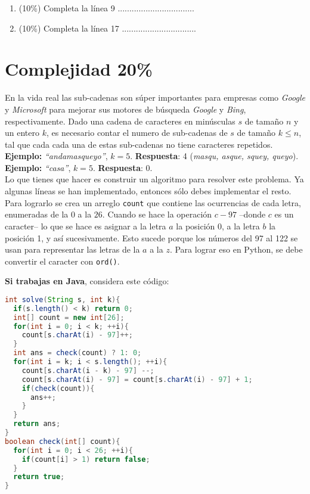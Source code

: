 \documentclass[10 pt]{article}
\begin{document}
\begin{enumerate}[label=\alph*]
\item (10\%) Completa la línea 9 .................................
\item (10\%) Completa la línea 17 ................................
\end{enumerate}

\newpage

\section{Complejidad 20\%}
En la vida real las sub-cadenas son súper importantes para empresas como \emph{Google} y \emph{Microsoft} para mejorar sus
motores de búsqueda \emph{Google} y \emph{Bing}, respectivamente. 
Dado una cadena de caracteres en minúsculas $s$ de tamaño $n$ y un entero $k$, es necesario contar el numero de sub-cadenas de $s$ de tamaño $k \leq n$, tal que cada cada una de estas sub-cadenas no tiene caracteres repetidos. \textbf{Ejemplo:} \textit{``andamasqueyo''}, $k = 5$. \textbf{Respuesta}: 4 (\textit{{masqu, asque, squey, queyo}}). \textbf{Ejemplo:} \textit{``casa''}, $k = 5$. \textbf{Respuesta}: $0$.
\\
Lo que tienes que hacer es construir un algoritmo para resolver este problema. Ya algunas líneas se han implementado, entonces sólo debes implementar el resto. Para lograrlo se crea un arreglo \texttt{count} que contiene las ocurrencias de cada letra, enumeradas de la $0$ a la $26$. Cuando se hace la operación $c - 97$ --donde $c$ es un caracter-- lo que se hace es asignar a la letra $a$ la posición 0, a la letra $b$ la posición 1, y así sucesivamente. Esto sucede porque los números del 97 al 122 se usan para representar las letras de la $a$ a la $z$. Para lograr eso en Python, se debe convertir el caracter con \texttt{ord()}.

\hspace{1cm}

\textbf{Si trabajas en Java}, considera este código:

{\small
\begin{lstlisting}[language = Java]
int solve(String s, int k){
  if(s.length() < k) return 0;
  int[] count = new int[26];
  for(int i = 0; i < k; ++i){
    count[s.charAt(i) - 97]++;
  }
  int ans = check(count) ? 1: 0;
  for(int i = k; i < s.length(); ++i){
    count[s.charAt(i - k) - 97] --;
    count[s.charAt(i) - 97] = count[s.charAt(i) - 97] + 1;
    if(check(count)){
      ans++;
    }
  }
  return ans;
}
boolean check(int[] count){
  for(int i = 0; i < 26; ++i){
    if(count[i] > 1) return false;
  }
  return true;
}
\end{lstlisting}
}
\end{document}
